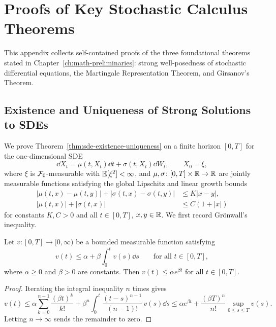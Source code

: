 \chapter{Proofs of Key Stochastic Calculus Theorems}\label{ch:girsanov-proof}

This appendix collects self-contained proofs of the three foundational theorems stated in Chapter~\ref{ch:math-preliminaries}: strong well-posedness of stochastic differential equations, the Martingale Representation Theorem, and Girsanov's Theorem.

\section{Existence and Uniqueness of Strong Solutions to SDEs}\label{sec:proof-sde-wellposed}

We prove Theorem~\ref{thm:sde-existence-uniqueness} on a finite horizon $[0, T]$ for the one-dimensional SDE
\begin{equation}\label{eq:app-sde}
    \dd X_t = \mu(t, X_t)\dd t + \sigma(t, X_t)\dd W_t, \qquad X_0 = \xi,
\end{equation}
where $\xi$ is $\mathcal{F}_0$-measurable with $\mathbb{E}[\xi^2] < \infty$, and $\mu, \sigma \colon [0, T] \times \mathbb{R} \to \mathbb{R}$ are jointly measurable functions satisfying the global Lipschitz and linear growth bounds
\begin{align}
    |\mu(t, x) - \mu(t, y)| + |\sigma(t, x) - \sigma(t, y)| &\leq K |x - y|, \label{eq:app-lipschitz} \\
    |\mu(t, x)| + |\sigma(t, x)| &\leq C(1 + |x|) \label{eq:app-growth}
\end{align}
for constants $K, C > 0$ and all $t \in [0, T]$, $x, y \in \mathbb{R}$. We first record Gr\"onwall's inequality.

\begin{lemma}\label{lem:gronwall}
    Let $v \colon [0, T] \to [0, \infty)$ be a bounded measurable function satisfying
    \[
    v(t) \leq \alpha + \beta \int_0^t v(s)\dd s \qquad \text{for all } t \in [0, T],
    \]
    where $\alpha \geq 0$ and $\beta > 0$ are constants. Then $v(t) \leq \alpha e^{\beta t}$ for all $t \in [0, T]$.
\end{lemma}
\begin{proof}
    Iterating the integral inequality $n$ times gives
    \[
    v(t) \leq \alpha \sum_{k=0}^{n-1} \frac{(\beta t)^k}{k!} + \beta^n \int_0^t \frac{(t - s)^{n-1}}{(n - 1)!}\,v(s)\dd s
    \leq \alpha e^{\beta t} + \frac{(\beta T)^n}{n!}\sup_{0 \leq s \leq T} v(s).
    \]
    Letting $n \to \infty$ sends the remainder to zero.
\end{proof}


